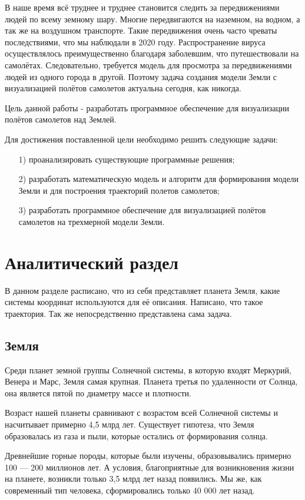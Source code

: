 \documentclass[14pt, a4paper]{extarticle}
\begin{document}
	В наше время всё труднее и труднее становится следить за передвижениями людей по всему земному шару. Многие передвигаются на наземном, на водном, а так же на воздушном транспорте. Такие передвижения очень часто чреваты последствиями, что мы наблюдали в 2020 году. Распространение вируса осуществлялось преимущественно благодаря заболевшим, что путешествовали на самолётах. Следовательно, требуется модель для просмотра за передвижениями людей из одного города в другой. Поэтому задача создания модели Земли с визуализацией полётов самолетов актуальна сегодня, как никогда.\par
	
	Цель данной работы - разработать программное обеспечение для визуализации полётов самолетов над Землей.\par
	Для достижения поставленной цели необходимо решить следующие задачи:
	\begin{itemize}
		\item[1)] проанализировать существующие программные решения;
		\item[2)] разработать математическую модель и алгоритм для формирования модели Земли
		 и для построения траекторий полетов самолетов;
		 \item[3)] разработать программное обеспечение для визуализацией полётов самолетов на трехмерной модели Земли.
	\end{itemize}
	
	\clearpage
	\section{Аналитический раздел}
	В данном разделе расписано, что из себя представляет планета Земля, какие системы координат используются для её описания. Написано, что такое траектория. Так же непосредственно представлена сама задача.\par
	
	\subsection{Земля}
	Среди планет земной группы Солнечной системы, в которую входят Меркурий, Венера и Марс, Земля самая крупная. Планета третья по удаленности от Солнца, она является пятой по диаметру массе и плотности.\par
	Возраст нашей планеты сравнивают с возрастом всей Солнечной системы и насчитывает примерно 4,5 млрд лет. Существует гипотеза, что Земля образовалась из газа и пыли, которые остались от формирования солнца.\par
	Древнейшие горные породы, которые были изучены, образовывались примерно
	100 — 200 миллионов лет. А условия, благоприятные для возникновения жизни на планете, возникли только 3,5 млрд лет назад появились. Мы же, как современный тип человека, сформировались только 40 000 лет назад.\par
	
\end{document}
